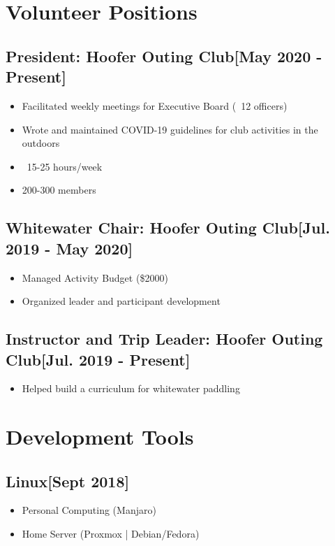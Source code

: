 \documentclass{article}
\begin{document}

\section{Volunteer Positions}

    \subsection{\textbf{President}: Hoofer Outing Club\hfill[May 2020 - Present]}
        \begin{itemize}
            \item Facilitated weekly meetings for Executive Board (~12 officers)
            \item Wrote and maintained COVID-19 guidelines for club activities in the outdoors
            \item ~15-25 hours/week
            \item 200-300 members
        \end{itemize}

    \subsection{\textbf{Whitewater Chair}: Hoofer Outing Club\hfill[Jul. 2019 - May 2020]}
        \begin{itemize}
            \item Managed Activity Budget (\$2000)
            \item Organized leader and participant development
        \end{itemize}

    \subsection{\textbf{Instructor and Trip Leader}: Hoofer Outing Club\hfill[Jul. 2019 - Present]}
        \begin{itemize}
            \item Helped build a curriculum for whitewater paddling
        \end{itemize}

\section{Development Tools}

    \subsection{\textbf{Linux}\hfill[Sept 2018]}
        \begin{itemize}
            \item Personal Computing (Manjaro)
            \item Home Server (Proxmox | Debian/Fedora)
        \end{itemize}
\end{document}
